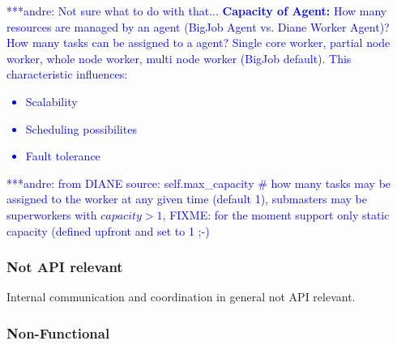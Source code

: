 \documentclass[]{article}
\newcommand{\alnote}[1]{ {\textcolor{blue} { ***andre: #1 }}}
\newcommand{\alnote}[1]{}
\begin{document}
\begin{itemize}


	
	
\end{itemize}

\alnote{Not sure what to do with that...
\textbf{Capacity of Agent:} How many resources are managed by an agent (BigJob Agent vs. Diane Worker Agent)? How many tasks can be assigned to a agent? Single core worker, partial node worker, whole node worker, multi node worker (BigJob
default). This characteristic influences: 
    \begin{itemize}
        \item Scalability
        \item Scheduling possibilites
        \item Fault tolerance
    \end{itemize}
    \alnote{from DIANE source: self.max\_capacity \# how many tasks may be 
    assigned to the worker at any given time (default 1), submasters may be 
    superworkers with $capacity>1$, FIXME: for the moment support only static 
    capacity (defined upfront and set to 1 ;-)}    
}

\subsubsection{Not API relevant}

Internal communication and coordination in general not API relevant.

\subsubsection{Non-Functional}
\end{document}
